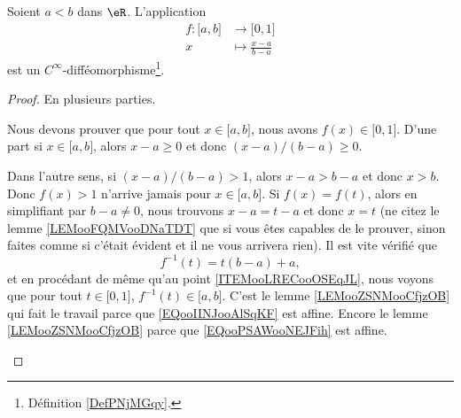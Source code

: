 \begin{lemma}       \label{LEMooAJDLooIPcmIV}
	Soient \( a<b\) dans \( \eR\). L'application
	\begin{equation}        \label{EQooIINJooAlSqKF}
		\begin{aligned}
			f\colon \mathopen[ a , b \mathclose] & \to \mathopen[ 0 , 1 \mathclose] \\
			x                                    & \mapsto \frac{ x-a }{ b-a }
		\end{aligned}
	\end{equation}
	est un \(  C^{\infty}\)-difféomorphisme\footnote{Définition \ref{DefPNjMGqy}.}.
\end{lemma}

\begin{proof}
	En plusieurs parties.
	\begin{subproof}
		     \label{ITEMooLRECooOSEqJL}
		Nous devons prouver que pour tout \( x\in\mathopen[ a , b \mathclose]\), nous avons \( f(x)\in \mathopen[ 0 , 1 \mathclose]\). D'une part si \( x\in\mathopen[ a , b \mathclose]\), alors \( x-a\geq 0\) et donc \( (x-a)/(b-a)\geq 0\).

		Dans l'autre sens, si \( (x-a)/(b-a)>1\), alors \( x-a>b-a\) et donc \( x>b\). Donc \( f(x)>1\) n'arrive jamais pour \( x\in \mathopen[ a , b \mathclose]\).
		\spitem[Injectif]
		Si \( f(x)=f(t)\), alors en simplifiant par \( b-a\neq 0\), nous trouvons \( x-a=t-a\) et donc \( x=t\) (ne citez le lemme \ref{LEMooFQMVooDNaTDT} que si vous êtes capables de le prouver, sinon faites comme si c'était évident et il ne vous arrivera rien).
		\spitem[Surjectif]
		Il est vite vérifié que
		\begin{equation}       \label{EQooPSAWooNEJFih}
			f^{-1}(t)=t(b-a)+a,
		\end{equation}
		et en procédant de même qu'au point \ref{ITEMooLRECooOSEqJL}, nous voyons que pour tout \( t\in \mathopen[ 0 , 1 \mathclose]\), \( f^{-1}(t)\in\mathopen[ a , b \mathclose]\).
		C'est le lemme \ref{LEMooZSNMooCfjzOB} qui fait le travail parce que \eqref{EQooIINJooAlSqKF} est affine.
		Encore le lemme \ref{LEMooZSNMooCfjzOB} parce que \eqref{EQooPSAWooNEJFih} est affine.
	\end{subproof}
\end{proof}



